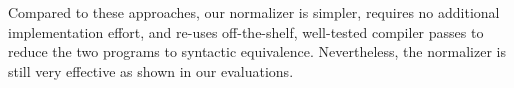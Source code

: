 Compared to these approaches, our normalizer is simpler, requires no additional 
implementation effort, and re-uses off-the-shelf, well-tested compiler passes 
to reduce the two programs to syntactic equivalence. Nevertheless, the 
normalizer is still very effective as shown in our evaluations.






